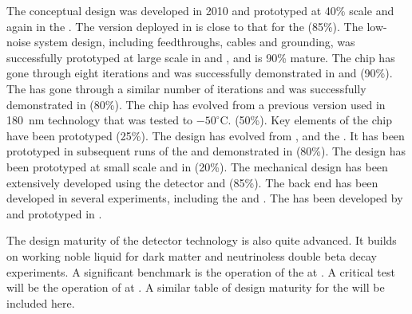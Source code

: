 The  conceptual design was developed in 2010 and prototyped
at 40\% scale and again in the . The version deployed in
 is close to that for the  (85\%). The
 low-noise system design, including feedthroughs, cables and
grounding, was successfully prototyped at large scale in
 and , and is 90\% mature. The
 chip has gone through eight iterations and was successfully
demonstrated in  and  (90\%). The
 has gone through a similar number of iterations and was
successfully demonstrated in  (80\%). The  chip
has evolved from a previous version used in  180~nm
technology that was tested to $-50^\circ$C. (50\%). Key elements of
the  chip have been prototyped (25\%). The 
design has evolved from ,  and the
.  It has been prototyped in subsequent runs of the
 and demonstrated in  (80\%). The 
 design has been prototyped at small scale and in
 (20\%). The mechanical design has been extensively
developed using the  detector and  (85\%). The
  back end has been developed in several
experiments, including the  and . The
   has been developed by
 and prototyped in .

The design maturity of the   detector technology is also quite
advanced. It builds on working noble liquid  for dark
matter and neutrinoless double beta decay experiments. A significant
benchmark is the operation of the  %
at
. A critical test will be the operation of  at . A
similar table of design maturity for the  will be included
here.


